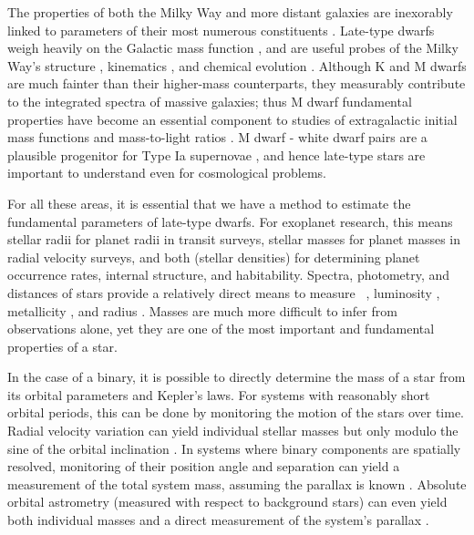 \documentclass[twocolumn]{aastex62}
\begin{document}
The properties of both the Milky Way and more distant galaxies are inexorably linked to parameters of their most numerous constituents \citep[$>$70\% of stars in the Solar neighborhood are M dwarfs,][]{Henry:1994fk,Reid:2004lr}. Late-type dwarfs weigh heavily on the Galactic mass function \citep[e.g.,][]{Covey:2008lr}, and are useful probes of the Milky Way's structure \citep[e.g.,][]{2008ApJ...673..864J,2017ApJ...843..141F}, kinematics \citep[e.g.,][]{2007AJ....134.2418B,2015RAA....15..860Y}, and chemical evolution \citep{Woolf:2012lr,2015AJ....149..140H}. Although K and M dwarfs are much fainter than their higher-mass counterparts, they measurably contribute to the integrated spectra of massive galaxies; thus M dwarf fundamental properties have become an essential component to studies of extragalactic initial mass functions \citep[e.g.,][]{2012ApJ...747...69C,2016ApJ...821...39M} and mass-to-light ratios \citep{2015MNRAS.452L..21S}. M dwarf - white dwarf pairs are a plausible progenitor for Type Ia supernovae \citep{2012ApJ...758..123W}, and hence late-type stars are important to understand even for cosmological problems.

For all these areas, it is essential that we have a method to estimate the fundamental parameters of late-type dwarfs. For exoplanet research, this means stellar radii for planet radii in transit surveys, stellar masses for planet masses in radial velocity surveys, and both (stellar densities) for determining planet occurrence rates, internal structure, and habitability. Spectra, photometry, and distances of stars provide a relatively direct means to measure \teff\ \citep[e.g.,][]{Rojas-Ayala:2012uq,Mann2013c}, luminosity \citep[e.g.,][]{2002AJ....124.2721R}, metallicity \citep[e.g.,][]{2005A&A...442..635B,2010ApJ...720L.113R}, and radius \citep[e.g., via Stefan-Boltzmann, ][]{Newton2015A,2018arXiv180404133K}. Masses are much more difficult to infer from observations alone, yet they are one of the most important and fundamental properties of a star.  

In the case of a binary, it is possible to directly determine the mass of a star from its orbital parameters and Kepler's laws. For systems with reasonably short orbital periods, this can be done by monitoring the motion of the stars over time.  Radial velocity variation can yield individual stellar masses but only modulo the sine of the orbital inclination \citep[e.g.,][]{Torres2002,Kraus2011,2017arXiv171205046S}. In systems where binary components are spatially resolved, monitoring of their position angle and separation can yield a measurement of the total system mass, assuming the parallax is known \citep[e.g.,][]{Soderhjelm1999,Woi2003,2009ApJ...699..168D}. Absolute orbital astrometry (measured with respect to background stars) can even yield both individual masses and a direct measurement of the system's parallax \citep[e.g.,][]{Koh2012,Benedict2016}. 
\end{document}
